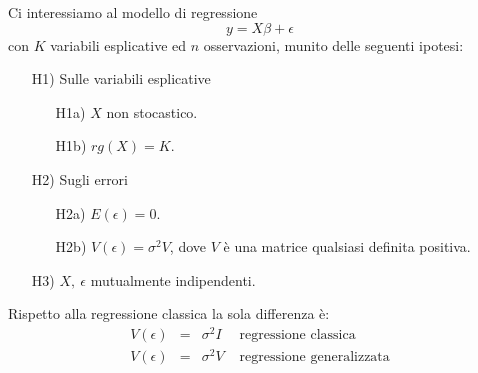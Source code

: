 \documentclass[a4paper]{report}
\newcounter{def}
\theoremstyle{remark}
\begin{document}
Ci interessiamo al modello di regressione 
\begin{equation}
y=X\beta + \epsilon
\end{equation}
con $K$ variabili esplicative ed $n$ osservazioni, munito delle seguenti
ipotesi:

\begin{enumerate}
\item[H1)] Sulle variabili esplicative

\begin{enumerate}
\item[H1a)] $X$ non stocastico.

\item[H1b)] $rg(X)=K$.
\end{enumerate}

\item[H2)] Sugli errori

\begin{enumerate}
\item[H2a)] $E(\epsilon)=0$.

\item[H2b)] $V(\epsilon )=\sigma ^{2}V$, dove $V$ \`{e} una matrice
qualsiasi definita positiva.
\end{enumerate}

\item[H3)] $X, \ \epsilon$ mutualmente indipendenti.
\end{enumerate}

Rispetto alla regressione classica la sola differenza \`e: 
\begin{equation}
\begin{array}{rcll}
V(\epsilon) & = & \sigma^2I & \text{ regressione classica} \\ 
V(\epsilon) & = & \sigma^2V & \text{ regressione generalizzata}%
\end{array}%
\end{equation}
\end{document}
